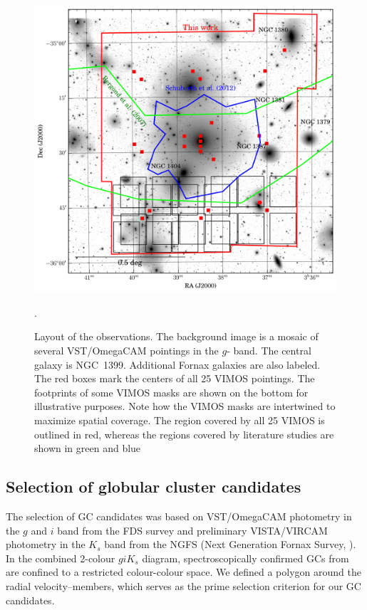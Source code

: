 \documentclass[useAMS,usenatbib]{mn2e}
\begin{document}
\begin{figure}
\centering
\includegraphics[scale=0.7]{figures/fov.png} 
\caption{Layout of the observations. The background image is a mosaic of several VST/OmegaCAM pointings in the $g$-
band. The central galaxy is NGC~1399. Additional Fornax galaxies are also labeled. The red boxes mark the centers of all 
25 VIMOS pointings. The footprints of some VIMOS masks are shown on the bottom for illustrative purposes. Note how 
the VIMOS masks are intertwined to maximize spatial coverage. The region covered by all 25 VIMOS is outlined in red, 
whereas the regions covered by literature studies are shown in green \citep{Bergond07} and blue \citep{Schuberth10}}.
\label{fig:fov}
\end{figure}

\subsection{Selection of globular cluster candidates}
\label{sec:selectionGC}
The selection of GC candidates was based on VST/OmegaCAM photometry in the $g$ and $i$ band from the FDS survey 
\citep{DAbrusco16,Iodice16} and preliminary VISTA/VIRCAM photometry in the $K_s$ band from the NGFS (Next 
Generation Fornax Survey, \citealt{Munoz14}). 
In the combined 2-colour $giK_s$ diagram, spectroscopically confirmed GCs from \citet{Schuberth} are confined to a restricted colour-colour space. 
We defined a polygon around the radial velocity--members, which serves as the prime selection criterion for our GC candidates. 
\end{document}
